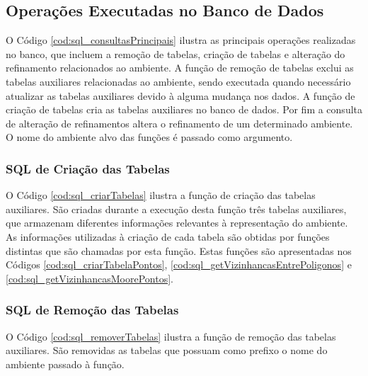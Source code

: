 \newpage

\subsection{Operações Executadas no Banco de Dados}

O Código \ref{cod:sql_consultasPrincipais} ilustra as principais operações realizadas no banco, que incluem a remoção de tabelas, criação de tabelas e alteração do refinamento relacionados ao ambiente. A função de remoção de tabelas exclui as tabelas auxiliares relacionadas ao ambiente, sendo executada quando necessário atualizar as tabelas auxiliares devido à alguma mudança nos dados. A função de criação de tabelas cria as tabelas auxiliares no banco de dados. Por fim a consulta de alteração de refinamentos altera o refinamento de um determinado ambiente. O nome do ambiente alvo das funções é passado como argumento.



\subsubsection{SQL de Criação das Tabelas}

O Código \ref{cod:sql_criarTabelas} ilustra a função de criação das tabelas auxiliares. São criadas durante a execução desta função três tabelas auxiliares, que armazenam diferentes informações relevantes à representação do ambiente. As informações utilizadas à criação de cada tabela são obtidas por funções distintas que são chamadas por esta função. Estas funções são apresentadas nos Códigos \ref{cod:sql_criarTabelaPontos}, \ref{cod:sql_getVizinhancasEntrePoligonos} e \ref{cod:sql_getVizinhancasMoorePontos}.



\subsubsection{SQL de Remoção das Tabelas}

O Código \ref{cod:sql_removerTabelas} ilustra a função de remoção das tabelas auxiliares. São removidas as tabelas que possuam como prefixo o nome do ambiente passado à função. 


